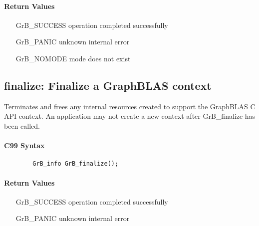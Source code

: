 \paragraph{Return Values}

\begin{itemize}[leftmargin=2.1in]
\item[{\sf GrB\_SUCCESS}]        operation completed successfully
\item[{\sf GrB\_PANIC}]          unknown internal error
\item[{\sf GrB\_NOMODE}]         mode does not exist
\end{itemize}


\subsection{{\sf finalize}: Finalize a GraphBLAS context}

Terminates and frees any internal resources created to 
support the GraphBLAS C API context.
An application may not create a new context after 
{\sf GrB\_finalize} has been called.

\paragraph{C99 Syntax}

\begin{verbatim}
        GrB_info GrB_finalize();
\end{verbatim}

\paragraph{Return Values}

\begin{itemize}[leftmargin=2.1in]
\item[{\sf GrB\_SUCCESS}]        operation completed successfully
\item[{\sf GrB\_PANIC}]          unknown internal error
\end{itemize}

